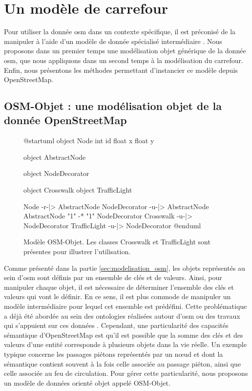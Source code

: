 \todo{}

\section{Un modèle de carrefour}

Pour utiliser la donnée \gls{osm} dans un contexte spécifique, il est préconisé de la manipuler à l'aide d'un modèle de donnée spécialisé intermédiaire \cite{Touya2014}. Nous proposons dans un premier temps une modélisation objet générique de la donnée \gls{osm}, que nous appliquons dans un second temps à la modélisation du carrefour. Enfin, nous présentons les méthodes permettant d'instancier ce modèle depuis OpenStreetMap.

\subsection{OSM-Objet : une modélisation objet de la donnée OpenStreetMap}

\begin{figure}
\centering
\begin{plantuml}

    @startuml
    object Node {
        int id
        float x
        float y
    }

    object AbstractNode

    object NodeDecorator

    object Crosswalk
    object TrafficLight

    Node -r-|> AbstractNode
    NodeDecorator -u-|> AbstractNode
    AbstractNode "1" -* "1" NodeDecorator
    Crosswalk -u-|> NodeDecorator
    TrafficLight -u-|> NodeDecorator
    @enduml
    
\end{plantuml}
\caption[Modèle OSM-Objet.]{Modèle OSM-Objet. Les classes Crosswalk et TrafficLight sont présentes pour illustrer l'utilisation.}
\label{fig:modelisation_osm_objet}
\end{figure}

Comme présenté dans la partie \ref{sec:modelisation_osm}, les objets représentés au sein d'\gls{osm} sont définis par un ensemble de clés et de valeurs. Ainsi, pour manipuler chaque objet, il est nécessaire de déterminer l'ensemble des clés et valeurs qui vont le définir. En ce sens, il est plus commode de manipuler un modèle intermédiaire pour lequel cet ensemble est prédéfini. Cette problématique a déjà été abordée au sein des ontologies réalisées autour d'\gls{osm}\cite{Codescu2011,Hombiat2017} ou des travaux qui s'appuient sur ces données \cite{Touya2014}. Cependant, une particularité des capacités sémantique d'OpenStreetMap est qu'il est possible que la somme des clés et des valeurs d'une entité corresponde à plusieurs objets dans la vie réelle. Un exemple typique concerne les passages piétons représentés par un nœud et dont la sémantique contient souvent à la fois celle associée au passage piéton, ainsi que celle associée au feu de circulation. Pour gérer cette particularité, nous proposons un modèle de données orienté objet appelé OSM-Objet.

